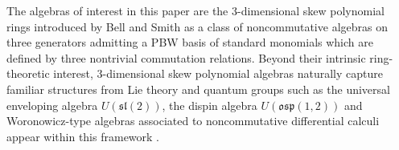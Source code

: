 \documentclass{amsart}
\theoremstyle{definition}
\theoremstyle{remark}
\numberwithin{equation}{section}
\begin{document}





The algebras of interest in this paper are the 3-dimensional skew polynomial rings introduced by Bell and Smith \cite{BellSmith1990} as a class of noncommutative algebras on three generators admitting a PBW basis of standard monomials which are defined by three nontrivial commutation relations. Beyond their intrinsic ring-theoretic interest, $3$-dimensional skew polynomial algebras naturally capture familiar structures from Lie theory and quantum groups such as the universal enveloping algebra $U(\mathfrak{sl}(2))$, the dispin algebra $U(\mathfrak{osp}(1,2))$ and Woronowicz-type algebras associated to noncommutative differential calculi appear within this framework \cite{ReyesSuarez20173D, Woronowicz1987}. 
\end{document}
